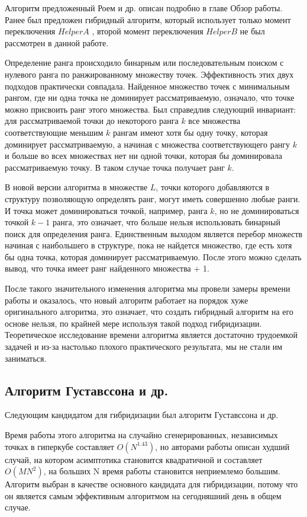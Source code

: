 Алгоритм предложенный Роем и др. описан подробно в главе Обзор работы. Ранее был предложен гибридный алгоритм, который использует только момент переключения $HelperA$ \cite{Markina}, второй момент переключения $HelperB$ не был рассмотрен в данной работе. 

Определение ранга происходило бинарным или последовательным поиском с нулевого ранга по ранжированному множеству точек. Эффективность этих двух подходов практически совпадала. Найденное множество точек с минимальным рангом, где ни одна точка не доминирует рассматриваемую, означало, что точке можно присвоить ранг этого множества. Был справедлив следующий инвариант: для рассматриваемой точки до некоторого ранга $k$ все множества соответствующие меньшим $k$ рангам имеют хотя бы одну точку, которая доминирует рассматриваемую, а начиная с множества соответствующего рангу $k$ и больше во всех множествах нет ни одной точки, которая бы доминировала рассматриваемую точку. В таком случае точка получает ранг $k$. 

В новой версии алгоритма в множестве $L$, точки которого добавляются в структуру позволяющую определять ранг, могут иметь совершенно любые ранги. И точка может доминироваться точкой, например, ранга $k$, но не доминироваться точкой $k-1$ ранга, это означает, что больше нельзя использовать бинарный поиск для определения ранга. Единственным выходом является перебор множеств начиная с наибольшего в структуре, пока не найдется множество, где есть хотя бы одна точка, которая доминирует рассматриваемую. После этого можно сделать вывод, что точка имеет ранг найденного множества + 1. 

После такого значительного изменения алгоритма мы провели замеры времени работы и оказалось, что новый алгоритм работает на порядок хуже оригинального алгоритма, это означает, что создать гибридный алгоритм на его основе нельзя, по крайней мере используя такой подход гибридизации. Теоретическое исследование времени алгоритма является достаточно трудоемкой задачей и из-за настолько плохого практического результата, мы не стали им заниматься. 

\subsection{Алгоритм Густавссона и др.}

Следующим кандидатом для гибридизации был алгоритм Густавссона и др. 

Время работы этого алгоритма на случайно сгенерированных, независимых точках в гиперкубе составляет $O(N^{1.43})$, но авторами работы описан худший случай, на котором асимптотика становится квадратичной и составляет $O(MN^2)$, на больших N время работы становится неприемлемо большим. Алгоритм выбран в качестве основного кандидата для гибридизации, потому что он является самым эффективным алгоритмом на сегодняшний день в общем случае. 

